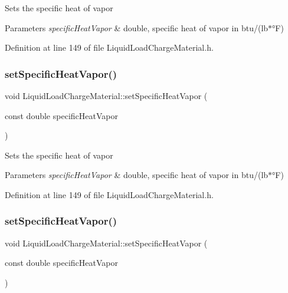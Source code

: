 Sets the specific heat of vapor 
\begin{DoxyParams}{Parameters}
{\em specific\+Heat\+Vapor} & double, specific heat of vapor in btu/(lb$\ast$°F) \\
\hline
\end{DoxyParams}


Definition at line 149 of file Liquid\+Load\+Charge\+Material.\+h.

\mbox{\label{class_liquid_load_charge_material_ae95faf01cf6293ab282b1b7fe3b849e1}} 
\subsubsection{\texorpdfstring{set\+Specific\+Heat\+Vapor()}{setSpecificHeatVapor()}\hspace{0.1cm}{\footnotesize\ttfamily [2/3]}}
{\footnotesize\ttfamily void Liquid\+Load\+Charge\+Material\+::set\+Specific\+Heat\+Vapor (\begin{DoxyParamCaption}\item[{const double}]{specific\+Heat\+Vapor }\end{DoxyParamCaption})\hspace{0.3cm}{\ttfamily [inline]}}

Sets the specific heat of vapor 
\begin{DoxyParams}{Parameters}
{\em specific\+Heat\+Vapor} & double, specific heat of vapor in btu/(lb$\ast$°F) \\
\hline
\end{DoxyParams}


Definition at line 149 of file Liquid\+Load\+Charge\+Material.\+h.

\mbox{\label{class_liquid_load_charge_material_ae95faf01cf6293ab282b1b7fe3b849e1}} 
\subsubsection{\texorpdfstring{set\+Specific\+Heat\+Vapor()}{setSpecificHeatVapor()}\hspace{0.1cm}{\footnotesize\ttfamily [3/3]}}
{\footnotesize\ttfamily void Liquid\+Load\+Charge\+Material\+::set\+Specific\+Heat\+Vapor (\begin{DoxyParamCaption}\item[{const double}]{specific\+Heat\+Vapor }\end{DoxyParamCaption})\hspace{0.3cm}{\ttfamily [inline]}}

